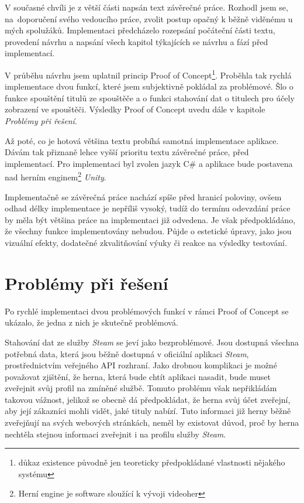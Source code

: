 \documentclass[12pt, a4paper]{article}
\begin{document}
V současné chvíli je z větší části napsán text závěrečné práce. Rozhodl jsem se, na~doporučení svého vedoucího práce, zvolit postup opačný k běžně viděnému u mých spolužáků. Implementaci předcházelo rozepsání počáteční části textu, provedení návrhu a napsání všech kapitol týkajících se návrhu a fází před implementací.

V průběhu návrhu jsem uplatnil princip Proof of Concept\footnote{důkaz existence původně jen teoreticky předpokládané vlastnosti nějakého systému}. Proběhla tak rychlá implementace dvou funkcí, které jsem subjektivně pokládal za problémové. Šlo o funkce spouštění titulů ze spouštěče a o funkci stahování dat o titulech pro účely zobrazení ve spouštěči. Výsledky Proof of Concept uvedu dále v kapitole \textit{Problémy při řešení}.

Až poté, co je hotová většina textu probíhá samotná implementace aplikace. Dávám tak přiznaně lehce vyšší prioritu textu závěrečné práce, před implementací. Pro implementaci byl zvolen jazyk C\# a aplikace bude postavena nad herním enginem\footnote{Herní engine je software sloužící k vývoji videoher} \textit{Unity}.

Implementačně se závěrečná práce nachází spíše před hranicí poloviny, ovšem odhad délky implementace je nepříliš vysoký, tudíž do termínu odevzdání práce by měla být většina práce na implementaci již odvedena. Je však předpokládáno, že všechny funkce implementovány nebudou. Půjde o estetické úpravy, jako jsou vizuální efekty, dodatečné zkvalitňování výuky či reakce na výsledky testování.

\section{Problémy při řešení}

Po rychlé implementaci dvou problémových funkcí v rámci Proof of Concept se ukázalo, že jedna z nich je skutečně problémová.

Stahování dat ze služby \textit{Steam} se jeví jako bezproblémové. Jsou dostupná všechna potřebná data, která jsou běžně dostupná v oficiální aplikaci \textit{Steam}, prostřednictvím veřejného API rozhraní. Jako drobnou komplikaci je možné považovat zjištění, že herna, která bude chtít aplikaci nasadit, bude muset zveřejnit svůj profil na zmíněné službě. Tomuto problému však nepřikládám takovou vážnost, jelikož se obecně dá předpokládat, že herna svůj účet zveřejní, aby její zákazníci mohli vidět, jaké tituly nabízí. Tuto informaci již herny běžně zveřejňují na svých webových stránkách, neměl by existovat důvod, proč by herna nechtěla stejnou informaci zveřejnit i na profilu služby \textit{Steam}.
\end{document}
